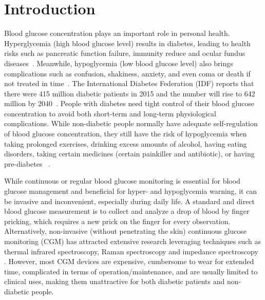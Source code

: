 
\section{Introduction}
\label{sec:intro}
Blood glucose concentration plays an important role in personal health.
Hyperglycemia (high blood glucose level) results in diabetes, leading to health risks such as pancreatic function failure, immunity reduce and ocular fundus diseases~\cite{bib:DC95:Klein}.
Meanwhile, hypoglycemia (low blood glucose level) also brings complications such as confusion, shakiness, anxiety, and even coma or death if not treated in time~\cite{bib:AJM91:DCCT}.
The International Diabetes Federation (IDF) reports that there were 415 million diabetic patients in 2015 and the number will rise to 642 million by 2040~\cite{bib:IDF15}.
People with diabetes need tight control of their blood glucose concentration to avoid both short-term and long-term physiological complications.
While non-diabetic people normally have adequate self-regulation of blood glucose concentration, they still have the risk of hypoglycemia when taking prolonged exercises, drinking excess amounts of alcohol, having eating disorders, taking certain medicines (\eg certain painkiller and antibiotic), or having pre-diabetes~\cite{bib:JCEM13:Eckert} \cite{bib:NEJM82:Felig}.

While continuous or regular blood glucose monitoring is essential for blood glucose management and beneficial for hyper- and hypoglycemia warning, it can be invasive and inconvenient, especially during daily life.
A standard and direct blood glucose measurement is to collect and analyze a drop of blood by finger pricking, which requires a new prick on the finger for every  observation.
Alternatively, non-invasive (without penetrating the skin) continuous glucose monitoring (CGM) has attracted extensive research leveraging techniques such as thermal infrared spectroscopy, Raman spectroscopy and impedance spectroscopy~\cite{bib:MEP08:Do} \cite{bib:JDST10:Vaddiraju}.
However, most CGM devices are expensive, cumbersome to wear for extended time, complicated in terms of operation/maintenance, and are usually limited to clinical uses, making them unattractive for both diabetic patients and non-diabetic people.

